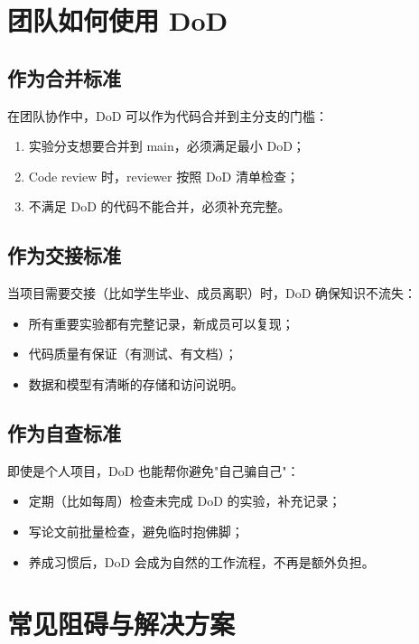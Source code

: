 \section{团队如何使用 DoD}

\subsection{作为合并标准}

在团队协作中，DoD 可以作为代码合并到主分支的门槛：

\begin{enumerate}
  \item 实验分支想要合并到 main，必须满足最小 DoD；
  \item Code review 时，reviewer 按照 DoD 清单检查；
  \item 不满足 DoD 的代码不能合并，必须补充完整。
\end{enumerate}

\subsection{作为交接标准}

当项目需要交接（比如学生毕业、成员离职）时，DoD 确保知识不流失：

\begin{itemize}
  \item 所有重要实验都有完整记录，新成员可以复现；
  \item 代码质量有保证（有测试、有文档）；
  \item 数据和模型有清晰的存储和访问说明。
\end{itemize}

\subsection{作为自查标准}

即使是个人项目，DoD 也能帮你避免"自己骗自己"：

\begin{itemize}
  \item 定期（比如每周）检查未完成 DoD 的实验，补充记录；
  \item 写论文前批量检查，避免临时抱佛脚；
  \item 养成习惯后，DoD 会成为自然的工作流程，不再是额外负担。
\end{itemize}

\section{常见阻碍与解决方案}

